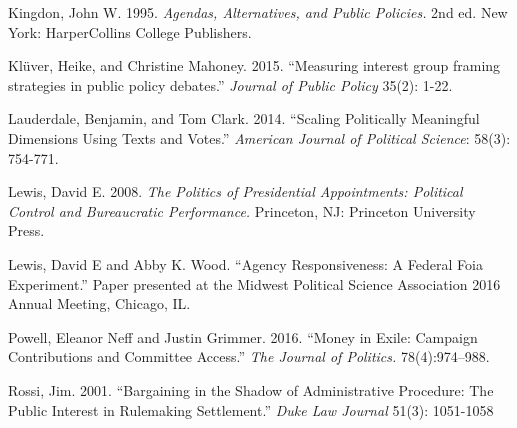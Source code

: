 Kingdon, John W.  1995.  \textit{Agendas, Alternatives, and Public Policies.}  2nd ed.  New York: HarperCollins College Publishers.

Kl\"uver, Heike, and Christine Mahoney. 2015. ``Measuring interest group framing strategies in public policy debates.'' \textit{Journal of Public Policy} 35(2): 1-22.


Lauderdale, Benjamin, and Tom Clark. 2014. ``Scaling Politically Meaningful Dimensions Using Texts and Votes.'' \textit{American Journal of Political Science}: 58(3): 754-771.

Lewis, David E. 2008. \textit{The Politics of Presidential Appointments: Political Control and Bureaucratic Performance.} Princeton, NJ: Princeton University Press.

Lewis, David E and Abby K. Wood. ``Agency Responsiveness: A Federal Foia Experiment.'' Paper presented at the Midwest Political Science Association 2016 Annual Meeting, Chicago, IL.

Powell, Eleanor Neff and Justin Grimmer. 2016. “Money in Exile: Campaign Contributions and Committee Access.” \textit{The Journal of Politics.} 78(4):974–988.




Rossi, Jim. 2001. ``Bargaining in the Shadow of Administrative Procedure: The Public Interest in Rulemaking Settlement.''  \textit{Duke Law Journal} 51(3): 1051-1058



